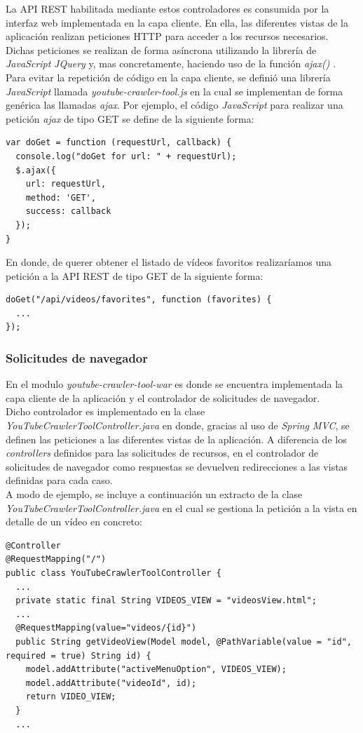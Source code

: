 \documentclass[11pt,a4paper]{article}
\begin{document}
La API REST habilitada mediante estos controladores es consumida por la interfaz web implementada en la capa cliente. En ella, las diferentes vistas de la aplicación realizan peticiones HTTP para acceder a los recursos necesarios. Dichas peticiones se realizan de forma asíncrona utilizando la librería de \textit{JavaScript} \textit{JQuery} y, mas concretamente, haciendo uso de la función \textit{ajax()} \cite{47}.
\\

Para evitar la repetición de código en la capa cliente, se definió una librería \textit{JavaScript} llamada  \textit{youtube-crawler-tool.js} en la cual se implementan de forma genérica las llamadas \textit{ajax}. Por ejemplo, el código \textit{JavaScript} para realizar una petición \textit{ajax} de tipo GET se define de la siguiente forma:
\begin{lstlisting}[style=C]
var doGet = function (requestUrl, callback) {
  console.log("doGet for url: " + requestUrl);
  $.ajax({ 
    url: requestUrl, 
    method: 'GET', 
    success: callback
  });
}
\end{lstlisting}	

En donde, de querer obtener el listado de vídeos favoritos realizaríamos una petición a la API REST de tipo GET de la siguiente forma:
\begin{lstlisting}[style=C]
doGet("/api/videos/favorites", function (favorites) {
  ...
});
\end{lstlisting}	

\medskip 

\subsubsection{Solicitudes de navegador}
En el modulo \textit{youtube-crawler-tool-war} es donde se encuentra implementada la capa cliente de la aplicación y el controlador de solicitudes de navegador.
\\

Dicho controlador es implementado en la clase \textit{YouTubeCrawlerToolController.java} en donde, gracias al uso de \textit{Spring MVC}, se definen las peticiones a las diferentes vistas de la aplicación. A diferencia de los \textit{controllers} definidos para las solicitudes de recursos, en el controlador de solicitudes de navegador como respuestas se devuelven redirecciones a las vistas definidas para cada caso.
\\

A modo de ejemplo, se incluye a continuación un extracto de la clase \textit{YouTubeCrawlerToolController.java} en el cual se gestiona la petición a la vista en detalle de un vídeo en concreto:
\begin{lstlisting}[style=C]
@Controller
@RequestMapping("/")
public class YouTubeCrawlerToolController {
  ...
  private static final String VIDEOS_VIEW = "videosView.html";
  ...
  @RequestMapping(value="videos/{id}")
  public String getVideoView(Model model, @PathVariable(value = "id", required = true) String id) {
    model.addAttribute("activeMenuOption", VIDEOS_VIEW);
    model.addAttribute("videoId", id);
    return VIDEO_VIEW;
  }
  ...
\end{lstlisting}	
\end{document}
